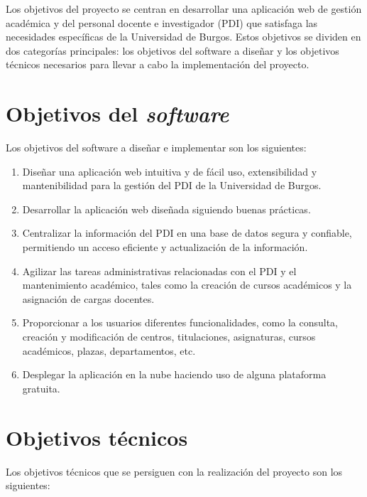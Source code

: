 
Los objetivos del proyecto se centran en desarrollar una aplicación web de gestión académica y del personal docente e investigador (PDI) que satisfaga las necesidades específicas de la Universidad de Burgos. Estos objetivos se dividen en dos categorías principales: los objetivos del software a diseñar y los objetivos técnicos necesarios para llevar a cabo la implementación del proyecto.

\section{Objetivos del \textit{software}}

Los objetivos del software a diseñar e implementar son los siguientes:

\begin{enumerate}
	\item Diseñar una aplicación web intuitiva y de fácil uso, extensibilidad y mantenibilidad para la gestión del PDI de la Universidad de Burgos.
  \item Desarrollar la aplicación web diseñada siguiendo buenas prácticas.
  \item Centralizar la información del PDI en una base de datos segura y confiable, permitiendo un acceso eficiente y actualización de la información.
  \item Agilizar las tareas administrativas relacionadas con el PDI y el mantenimiento académico, tales como la creación de cursos académicos y la asignación de cargas docentes.
  \item Proporcionar a los usuarios diferentes funcionalidades, como la consulta, creación y modificación de centros, titulaciones, asignaturas, cursos académicos, plazas, departamentos, etc.
  \item Desplegar la aplicación en la nube haciendo uso de alguna plataforma gratuita.
\end{enumerate}

\section{Objetivos técnicos}

Los objetivos técnicos que se persiguen con la realización del proyecto son los siguientes:

